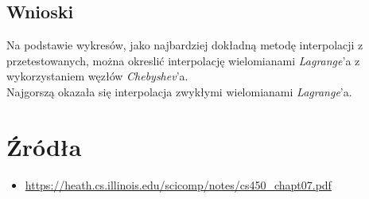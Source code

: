 \documentclass{article}
\begin{document}
\subsection*{Wnioski}
\null\quad Na podstawie wykresów, jako najbardziej dokładną metodę
interpolacji z przetestowanych, można okreslić interpolację wielomianami
\textit{Lagrange}'a z wykorzystaniem węzłów \textit{Chebyshev}'a. \\
\null\quad Najgorszą okazała się interpolacja zwykłymi wielomianami
\textit{Lagrange}'a.

\section*{Źródła}
\begin{itemize}
    \item \url{https://heath.cs.illinois.edu/scicomp/notes/cs450_chapt07.pdf}
\end{itemize}
\end{document}
